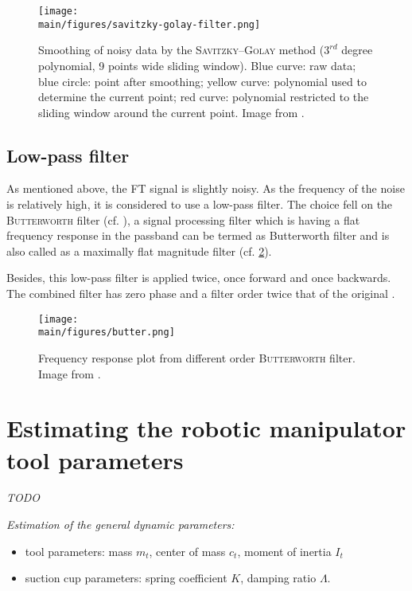 \documentclass[/home/francois/latex/report/main.tex]{subfiles}
\begin{document}
\begin{figure}
  \centering
  \texttt{[image: \\main/figures/savitzky-golay-filter.png]}
  \caption{Smoothing of noisy data by the \textsc{Savitzky–Golay} method ($3^{rd}$ degree polynomial, 9 points wide sliding window). Blue curve: raw data; blue circle: point after smoothing; yellow curve: polynomial used to determine the current point; red curve: polynomial restricted to the sliding window around the current point. Image from \cite{Cdang2013}.}
  \label{fig:method:savit}
\end{figure}

\subsection{Low-pass filter}

As mentioned above, the \ac{FT} signal is slightly noisy. As the frequency of the noise is relatively high, it is considered to use a low-pass filter. The choice fell on the \textsc{Butterworth} filter (cf. \cite{filter1923}), a signal processing filter which is having a flat frequency response in the passband can be termed as Butterworth filter and is also called as a maximally flat magnitude filter (cf. \ref{fig:method:butter}).

Besides, this low-pass filter is applied twice, once forward and once backwards. The combined filter has zero phase and a filter order twice that of the original \cite{SciPy2019}.

\begin{figure}
  \centering
  \texttt{[image: \\main/figures/butter.png]}
  \caption{Frequency response plot from different order \textsc{Butterworth} filter. Image from  \cite{filter1923}.}
  \label{fig:method:butter}
\end{figure}

\section{Estimating the robotic manipulator tool parameters}

\textit{TODO}



{\it
Estimation of the general dynamic parameters:

\begin{itemize}
  \item tool parameters: mass $m_t$, center of mass $c_t$, moment of inertia $I_t$
  \item suction cup parameters: spring coefficient $K$, damping ratio $\Lambda$.
\end{itemize}
}
\end{document}
